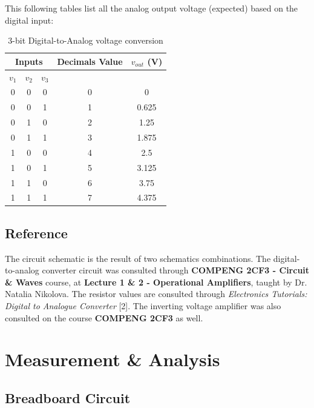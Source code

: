 \documentclass[12pt]{article}
\begin{document}
    This following tables list all the analog output voltage (expected) based on the digital input: 
    \begin{table}[H]
        \centering
        \begin{tabular}{|c|c|c|c|c|}
            \hline
            \multicolumn{3}{|c|}{\textbf{Inputs}} & \textbf{Decimals Value} & \(v_{out}\) (V) \\ \hline
            \(v_1\) & \(v_2\) & \(v_3\) &  & \\ \hline
            0 & 0 & 0 & 0 & 0 \\ \hline
            0 & 0 & 1 & 1 & 0.625 \\ \hline
            0 & 1 & 0 & 2 & 1.25 \\ \hline
            0 & 1 & 1 & 3 & 1.875 \\ \hline
            1 & 0 & 0 & 4 & 2.5 \\ \hline
            1 & 0 & 1 & 5 & 3.125 \\ \hline
            1 & 1 & 0 & 6 & 3.75 \\ \hline
            1 & 1 & 1 & 7 & 4.375 \\ \hline
        \end{tabular}
        \caption{3-bit Digital-to-Analog voltage conversion}
    \end{table}
     

     
    \subsection{Reference}

    The circuit schematic is the result of two schematics combinations. The digital-to-analog converter circuit was consulted through \textbf{COMPENG 2CF3 - Circuit \& Waves} course, at \textbf{Lecture 1 \& 2 - Operational Amplifiers}, taught by Dr. Natalia Nikolova. The resistor values are consulted through \textit{Electronics Tutorials: Digital to Analogue Converter} [2]. The inverting voltage amplifier was also consulted on the course \textbf{COMPENG 2CF3} as well. 


    \section{Measurement \& Analysis}
    \subsection{Breadboard Circuit}
\end{document}
